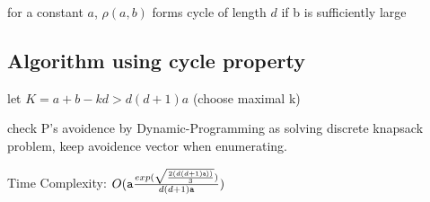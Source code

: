 \begin{corollary}
for a constant $a$, $\rho(a,b)$ forms cycle of length $d$ if b is sufficiently large
\end{corollary}

\subsection{Algorithm using cycle property}

let $K=a+b-kd>d(d+1)a$ (choose maximal k)

\begin{algorithmic}
     
    \ENDIF
  \ENDFOR
\end{algorithmic}
check P's avoidence by Dynamic-Programming as solving discrete knapsack problem, keep avoidence vector when enumerating.

Time Complexity: $O(\mathtt{a}\frac{exp(\sqrt{\frac{2(d(d+1)\mathtt{a}))}{3} } )}{d(d+1)\mathtt{a}})$
